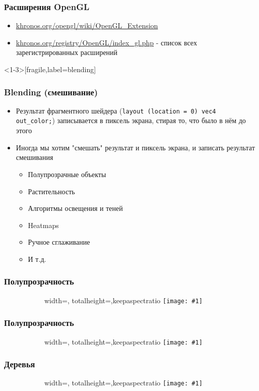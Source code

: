 \documentclass{beamer}
\newcommand{\slideimage}[1]{
  \begin{figure}
    \begin{adjustbox}{width=\textwidth, totalheight=\textheight-2\baselineskip-2\baselineskip,keepaspectratio}
      \texttt{[image: \#1]}
    \end{adjustbox}
  \end{figure}
}
\begin{document}
\begin{frame}[fragile]
\frametitle{Расширения OpenGL}
\begin{itemize}
\item \href{https://www.khronos.org/opengl/wiki/OpenGL_Extension}{khronos.org/opengl/wiki/OpenGL\_Extension}
\item \href{https://www.khronos.org/registry/OpenGL/index_gl.php}{khronos.org/registry/OpenGL/index\_gl.php} - список всех зарегистрированных расширений
\end{itemize}
\end{frame}

\begin{frame}<1-3>[fragile,label=blending]
\frametitle{Blending (смешивание)}
\begin{itemize}
\item Результат фрагментного шейдера (\verb|layout (location = 0) vec4 out_color;|) записывается в пиксель экрана, стирая то, что было в нём до этого
\pause
\item Иногда мы хотим "смешать" результат и пиксель экрана, и записать результат смешивания
\pause
\begin{itemize}
\item Полупрозрачные объекты
\pause
\item Растительность
\pause
\item Алгоритмы освещения и теней
\pause
\item Heatmaps
\pause
\item Ручное сглаживание
\pause
\item И т.д.
\end{itemize}
\end{itemize}
\end{frame}

\begin{frame}
\frametitle{Полупрозрачность}
\begin{figure}
\slideimage{window.png}
\end{figure}
\end{frame}

\begin{frame}
\frametitle{Полупрозрачность}
\begin{figure}
\slideimage{macos-ui.png}
\end{figure}
\end{frame}


\begin{frame}
\frametitle{Деревья}
\begin{figure}
\slideimage{birch.png}
\end{figure}
\end{frame}
\end{document}
